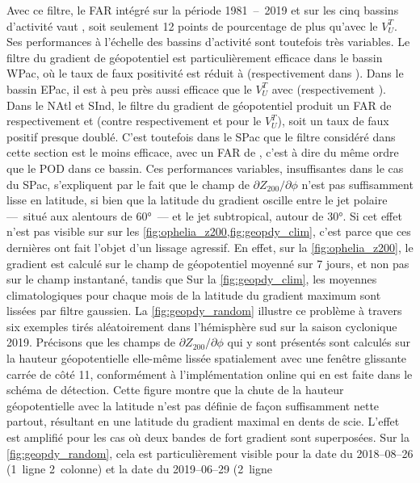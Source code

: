\documentclass[../main.tex]{subfiles}
\begin{document}
Avec ce filtre, le FAR intégré sur la période \num{1981}~--~\num{2019} et sur les cinq bassins d'activité vaut , soit seulement 12 points de
pourcentage de plus qu'avec le $V_U^T$. Ses performances à l'échelle des bassins d'activité sont toutefois très variables. Le filtre du gradient de géopotentiel
est particulièrement efficace dans le bassin WPac, où le taux de faux positivité est réduit à  (respectivement  dans
\textcite{dulac_assessing_2023}). Dans le bassin EPac, il est à peu près aussi efficace que le $V_U^T$ avec  (respectivement ). Dans le NAtl et
SInd, le filtre du gradient de géopotentiel produit un FAR de respectivement  et  (contre respectivement  et  pour le
$V_U^T$), soit un taux de faux positif presque doublé. C'est toutefois dans le SPac que le filtre considéré dans cette section est le moins efficace, avec un
FAR de , c'est à dire du même ordre que le POD dans ce bassin. Ces performances variables, insuffisantes dans le cas du SPac, s'expliquent par le fait
que le champ de $\partial Z_{200} / \partial \phi$ n'est pas suffisamment lisse en latitude, si bien que la latitude du gradient oscille entre le jet polaire
---~situé aux alentours de \ang{60}~--- et le jet subtropical, autour de \ang{30}. Si cet effet n'est pas visible sur sur les
\cref{fig:ophelia_z200,fig:geopdy_clim}, c'est parce que ces dernières ont fait l'objet d'un lissage agressif. En effet, sur la \cref{fig:ophelia_z200}, le gradient est
calculé sur le champ de géopotentiel moyenné sur \num{7} jours, et non pas sur le champ instantané, tandis que Sur la \cref{fig:geopdy_clim}, les moyennes climatologiques pour chaque mois de la latitude du
gradient maximum sont lissées par filtre gaussien. La \cref{fig:geopdy_random} illustre ce problème à travers six exemples tirés aléatoirement dans l'hémisphère
sud sur la saison cyclonique 2019. Précisons que les champs de $\partial Z_{200} / \partial \phi$ qui y sont présentés sont calculés sur la hauteur
géopotentielle elle-même lissée spatialement avec une fenêtre glissante carrée de côté 11, conformément à l'implémentation online qui en est faite dans le
schéma de détection. Cette figure montre que la chute de la hauteur géopotentielle avec la latitude n'est pas définie de façon suffisamment nette partout,
résultant en une latitude du gradient maximal en dents de scie. L'effet est amplifié pour les cas où deux bandes de fort gradient sont superposées. Sur la
\cref{fig:geopdy_random}, cela est particulièrement visible pour la date du 2018--08--26 (1\iere~ligne 2\ieme~colonne) et la date du 2019--06--29 (2\ieme~ligne
\end{document}
